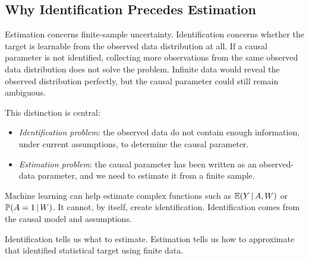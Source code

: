 \subsection{Why Identification Precedes Estimation}

Estimation concerns finite-sample uncertainty. Identification concerns whether the target is learnable from the observed data distribution at all. If a causal parameter is not identified, collecting more observations from the same observed data distribution does not solve the problem. Infinite data would reveal the observed distribution perfectly, but the causal parameter could still remain ambiguous.

This distinction is central:
\begin{itemize}
  \item \emph{Identification problem}: the observed data do not contain enough information, under current assumptions, to determine the causal parameter.
  \item \emph{Estimation problem}: the causal parameter has been written as an observed-data parameter, and we need to estimate it from a finite sample.
\end{itemize}

Machine learning can help estimate complex functions such as $\mathbb{E}(Y\,\vert\, A,W)$ or $\mathbb{P}(A=1\,\vert\, W)$. It cannot, by itself, create identification. Identification comes from the causal model and assumptions.

\begin{keyidea}
Identification tells us what to estimate. Estimation tells us how to approximate that identified statistical target using finite data.
\end{keyidea}
